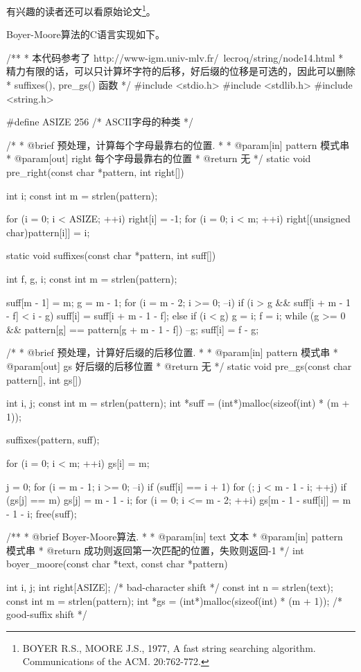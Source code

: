 有兴趣的读者还可以看原始论文\footnote{BOYER R.S., MOORE J.S., 1977, A fast string 
searching algorithm. Communications of the ACM. 20:762-772.}。

Boyer-Moore算法的C语言实现如下。
\begin{Codex}[label=boyer_moore.c]
/**
 * 本代码参考了 http://www-igm.univ-mlv.fr/~lecroq/string/node14.html
 * 精力有限的话，可以只计算坏字符的后移，好后缀的位移是可选的，因此可以删除
 * suffixes(), pre_gs() 函数
 */
#include <stdio.h>
#include <stdlib.h>
#include <string.h>

#define ASIZE 256  /* ASCII字母的种类 */

/*
 * @brief 预处理，计算每个字母最靠右的位置.
 *
 * @param[in] pattern 模式串
 * @param[out] right 每个字母最靠右的位置
 * @return 无
 */
static void pre_right(const char *pattern, int right[]) {
    int i;
    const int m = strlen(pattern);

    for (i = 0; i < ASIZE; ++i) right[i] = -1;
    for (i = 0; i < m; ++i) right[(unsigned char)pattern[i]] = i;
}


static void suffixes(const char *pattern, int suff[]) {
    int f, g, i;
    const int m = strlen(pattern);

    suff[m - 1] = m;
    g = m - 1;
    for (i = m - 2; i >= 0; --i) {
        if (i > g && suff[i + m - 1 - f] < i - g)
            suff[i] = suff[i + m - 1 - f];
        else {
            if (i < g)
                g = i;
            f = i;
            while (g >= 0 && pattern[g] == pattern[g + m - 1 - f])
                --g;
            suff[i] = f - g;
        }
    }
}

/*
 * @brief 预处理，计算好后缀的后移位置.
 *
 * @param[in] pattern 模式串
 * @param[out] gs 好后缀的后移位置
 * @return 无
 */
static void pre_gs(const char pattern[], int gs[]) {
    int i, j;
    const int m = strlen(pattern);
    int *suff = (int*)malloc(sizeof(int) * (m + 1));

    suffixes(pattern, suff);

    for (i = 0; i < m; ++i) gs[i] = m;

    j = 0;
    for (i = m - 1; i >= 0; --i) if (suff[i] == i + 1)
        for (; j < m - 1 - i; ++j) if (gs[j] == m)
            gs[j] = m - 1 - i;
    for (i = 0; i <= m - 2; ++i)
        gs[m - 1 - suff[i]] = m - 1 - i;
    free(suff);
}

/**
 * @brief Boyer-Moore算法.
 *
 * @param[in] text 文本
 * @param[in] pattern 模式串
 * @return 成功则返回第一次匹配的位置，失败则返回-1
 */
int boyer_moore(const char *text, const char *pattern) {
    int i, j;
    int right[ASIZE];  /* bad-character shift */
    const int n = strlen(text);
    const int m = strlen(pattern);
    int *gs = (int*)malloc(sizeof(int) * (m + 1));  /* good-suffix shift */

}
\end{Codex}
